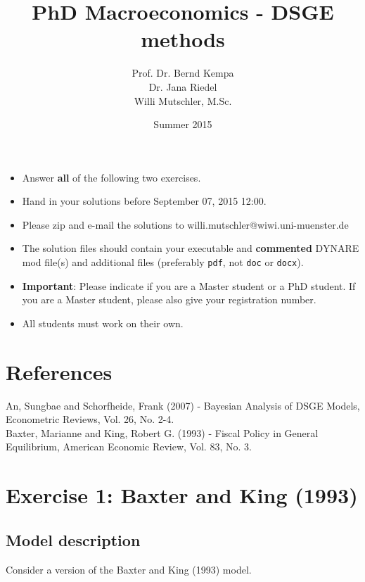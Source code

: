\documentclass{article}
\begin{document}
\title{PhD Macroeconomics - DSGE methods}
\author{Prof. Dr. Bernd Kempa\\Dr. Jana Riedel\\ Willi Mutschler, M.Sc.}
\date{Summer 2015}
\maketitle

\begin{itemize}
\item Answer \textbf{all} of the following two exercises.

\item Hand in your solutions before September 07, 2015 12:00.

\item Please zip and e-mail the solutions to willi.mutschler@wiwi.uni-muenster.de

\item The solution files should contain your executable and \textbf{commented} DYNARE mod file(s) and
additional files (preferably \texttt{pdf}, not \texttt{doc} or \texttt{docx}).

\item \textbf{Important}: Please indicate if you are a Master student or a
PhD student. If you are a Master student, please also give your registration
number.

\item All students must work on their own.

\end{itemize}
\bigskip \bigskip\bigskip\bigskip\bigskip\bigskip\bigskip\bigskip\bigskip
\bigskip \bigskip\bigskip\bigskip\bigskip\bigskip\bigskip\bigskip\bigskip
\section*{References}
An, Sungbae and Schorfheide, Frank (2007) - Bayesian Analysis of DSGE Models, Econometric Reviews, Vol. 26, No. 2-4.\\
Baxter, Marianne and King, Robert G. (1993) - Fiscal Policy in General Equilibrium, American Economic Review, Vol. 83, No. 3.

\newpage
\section*{Exercise 1: Baxter and King (1993)}
\subsection*{Model description}
Consider a version of the Baxter and King (1993) model.
\end{document}
